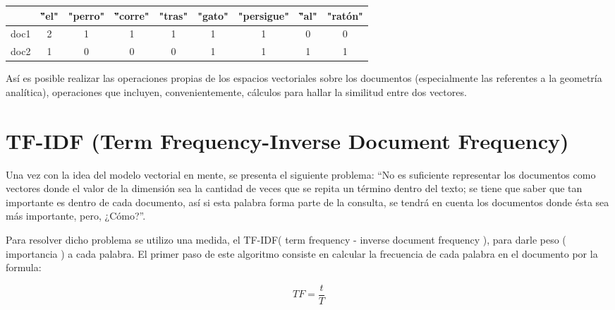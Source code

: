 \documentclass[10pt]{article}
\begin{document}
\renewcommand{\arraystretch}{1.5}

\begin{table}[h]
	\centering
	\bfseries \textcolor[RGB]{50,50,50}{
		\begin{tabular}{|c|c|c|c|c|c|c|c|c|}
			\hline
			\rowcolor[RGB]{200,200,200}
			& \""el" & "perro" & \""corre" & "tras" & "gato" & "persigue" & \""al" & "ratón" \\
			\hline
			\rowcolor[RGB]{200,200,200}
			doc1 & 2 & 1 & 1 & 1 & 1 & 1 & 0 & 0 \\
			\hline
			\rowcolor[RGB]{200,200,200}
			doc2 & 1 & 0 & 0 & 0 & 1 & 1 & 1 & 1 \\
			\hline
		\end{tabular}
	}
\end{table}

Así es posible realizar las operaciones propias de los espacios vectoriales sobre los documentos (especialmente las referentes a la geometría analítica), operaciones que incluyen, convenientemente, cálculos para hallar la similitud entre dos vectores.

\clearpage
\section{TF-IDF (Term Frequency-Inverse Document Frequency)}
\label{sec:tf-idf}

Una vez con la idea del modelo vectorial en mente, se presenta el siguiente problema: “No es suficiente representar los documentos como vectores donde el valor de la dimensión sea la cantidad de veces que se repita un término dentro del texto; se tiene que saber que tan importante es dentro de cada documento, así si esta palabra forma parte de la consulta, se tendrá en cuenta los documentos donde ésta sea más importante, pero, ¿Cómo?”.

\vspace*{.2cm}

Para resolver dicho problema se utilizo una medida, el TF-IDF( term frequency - inverse document frequency ), para darle peso ( importancia ) a cada palabra. El primer paso de este algoritmo consiste en calcular la frecuencia de cada palabra en el documento por la formula:

\Huge
\begin{equation*}		
	TF = \frac{t}{T}
\end{equation*}
\normalsize

\vspace{1cm}
\end{document}
